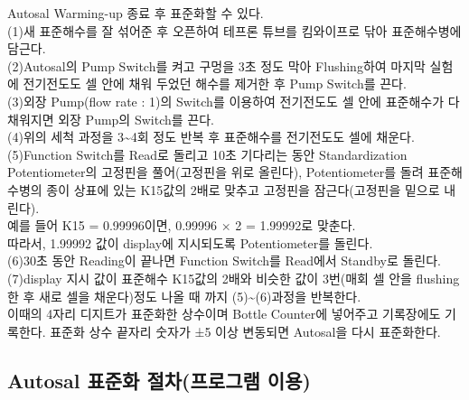 \documentclass[
]{book}
\begin{document}
Autosal Warming-up 종료 후 표준화할 수 있다.\\
(1)새 표준해수를 잘 섞어준 후 오픈하여 테프론 튜브를 킴와이프로 닦아 표준해수병에 담근다.\\
(2)Autosal의 Pump Switch를 켜고 구멍을 3초 정도 막아 Flushing하여 마지막 실험에 전기전도도 셀 안에 채워 두었던 해수를 제거한 후 Pump Switch를 끈다.\\
(3)외장 Pump(flow rate : 1)의 Switch를 이용하여 전기전도도 셀 안에 표준해수가 다 채워지면 외장 Pump의 Switch를 끈다.\\
(4)위의 세척 과정을 3\textasciitilde4회 정도 반복 후 표준해수를 전기전도도 셀에 채운다.\\
(5)Function Switch를 Read로 돌리고 10초 기다리는 동안 Standardization Potentiometer의 고정핀을 풀어(고정핀을 위로 올린다), Potentiometer를 돌려 표준해수병의 종이 상표에 있는 K15값의 2배로 맞추고 고정핀을 잠근다(고정핀을 밑으로 내린다).\\
예를 들어 K15 = 0.99996이면, 0.99996 × 2 = 1.99992로 맞춘다.\\
따라서, 1.99992 값이 display에 지시되도록 Potentiometer를 돌린다.\\
(6)30초 동안 Reading이 끝나면 Function Switch를 Read에서 Standby로 돌린다.\\
(7)display 지시 값이 표준해수 K15값의 2배와 비슷한 값이 3번(매회 셀 안을 flushing한 후 새로 셀을 채운다)정도 나올 때 까지 (5)\textasciitilde(6)과정을 반복한다.\\
이때의 4자리 디지트가 표준화한 상수이며 Bottle Counter에 넣어주고 기록장에도 기록한다. 표준화 상수 끝자리 숫자가 ±5 이상 변동되면 Autosal을 다시 표준화한다.

\hypertarget{autosal-uxd45cuxc900uxd654-uxc808uxcc28uxd504uxb85cuxadf8uxb7a8-uxc774uxc6a9}{%
\subsection{Autosal 표준화 절차(프로그램 이용)}\label{autosal-uxd45cuxc900uxd654-uxc808uxcc28uxd504uxb85cuxadf8uxb7a8-uxc774uxc6a9}}
\end{document}
